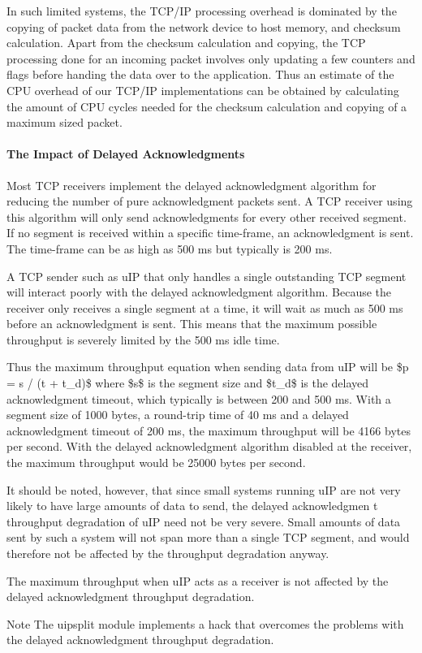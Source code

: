 In such limited systems, the T\+C\+P/\+IP processing overhead is dominated by the copying of packet data from the network device to host memory, and checksum calculation. Apart from the checksum calculation and copying, the T\+CP processing done for an incoming packet involves only updating a few counters and flags before handing the data over to the application. Thus an estimate of the C\+PU overhead of our T\+C\+P/\+IP implementations can be obtained by calculating the amount of C\+PU cycles needed for the checksum calculation and copying of a maximum sized packet.\hypertarget{a00074_delack}{}\paragraph{The Impact of Delayed Acknowledgments}\label{a00074_delack}
Most T\+CP receivers implement the delayed acknowledgment algorithm for reducing the number of pure acknowledgment packets sent. A T\+CP receiver using this algorithm will only send acknowledgments for every other received segment. If no segment is received within a specific time-\/frame, an acknowledgment is sent. The time-\/frame can be as high as 500 ms but typically is 200 ms.

A T\+CP sender such as u\+IP that only handles a single outstanding T\+CP segment will interact poorly with the delayed acknowledgment algorithm. Because the receiver only receives a single segment at a time, it will wait as much as 500 ms before an acknowledgment is sent. This means that the maximum possible throughput is severely limited by the 500 ms idle time.

Thus the maximum throughput equation when sending data from u\+IP will be \$p = s / (t + t\+\_\+d)\$ where \$s\$ is the segment size and \$t\+\_\+d\$ is the delayed acknowledgment timeout, which typically is between 200 and 500 ms. With a segment size of 1000 bytes, a round-\/trip time of 40 ms and a delayed acknowledgment timeout of 200 ms, the maximum throughput will be 4166 bytes per second. With the delayed acknowledgment algorithm disabled at the receiver, the maximum throughput would be 25000 bytes per second.

It should be noted, however, that since small systems running u\+IP are not very likely to have large amounts of data to send, the delayed acknowledgmen t throughput degradation of u\+IP need not be very severe. Small amounts of data sent by such a system will not span more than a single T\+CP segment, and would therefore not be affected by the throughput degradation anyway.

The maximum throughput when u\+IP acts as a receiver is not affected by the delayed acknowledgment throughput degradation.

\begin{DoxyNote}{Note}
The uipsplit module implements a hack that overcomes the problems with the delayed acknowledgment throughput degradation. 
\end{DoxyNote}
